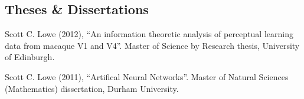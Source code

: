 \documentclass[11pt, a4paper]{article} %
\renewenvironment{itemize}{
  \begin{list}{}{
    \setlength{\leftmargin}{0em}
  }
}{
  \end{list}
}
\begin{document}
\subsection*{Theses \& Dissertations}
%
\begin{itemize}
%
\item
Scott C. Lowe (2012), ``An information theoretic analysis of perceptual learning data from macaque V1 and V4''.
Master of Science by Research thesis, University of Edinburgh.
%
\item
Scott C. Lowe (2011), ``Artifical Neural Networks''.
Master of Natural Sciences (Mathematics) dissertation, Durham University.
%
\end{itemize}
%
%
%
%
%
%
%
%
%
%
%
%
%
%
%
%
%
%
%
\end{document}

